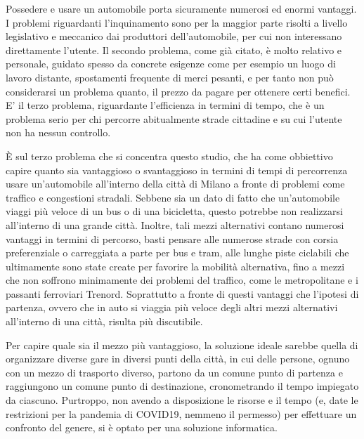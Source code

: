 Possedere e usare un automobile porta sicuramente numerosi ed enormi vantaggi. I problemi riguardanti l'inquinamento sono per la maggior parte risolti a livello legislativo e meccanico dai produttori dell'automobile, per cui non interessano direttamente l'utente. Il secondo problema, come già citato, è molto relativo e personale, guidato spesso da concrete esigenze come per esempio un luogo di lavoro distante, spostamenti frequente di merci pesanti, e per tanto non può considerarsi un problema quanto, il prezzo da pagare per ottenere certi benefici. E' il terzo problema, riguardante l'efficienza in termini di tempo, che è un problema serio per chi percorre abitualmente strade cittadine e su cui l'utente non ha nessun controllo.



È sul terzo problema che si concentra questo studio, che ha come obbiettivo capire quanto sia vantaggioso o svantaggioso in termini di tempi di percorrenza usare un'automobile all'interno della città di Milano a fronte di problemi come traffico e congestioni stradali.
Sebbene sia un dato di fatto che un'automobile viaggi più veloce di un bus o di una bicicletta, questo potrebbe non realizzarsi all'interno di una grande città. Inoltre, tali mezzi alternativi contano numerosi vantaggi in termini di percorso, basti pensare alle numerose strade con corsia preferenziale o carreggiata a parte per bus e tram, alle lunghe piste ciclabili che ultimamente sono state create per favorire la mobilità alternativa, fino a mezzi che non soffrono minimamente dei problemi del traffico, come le metropolitane e i passanti ferroviari Trenord. Soprattutto a fronte di questi vantaggi che l'ipotesi di partenza, ovvero che in auto si viaggia più veloce degli altri mezzi alternativi all'interno di una città, risulta più discutibile.

Per capire quale sia il mezzo più vantaggioso, la soluzione ideale sarebbe quella di organizzare diverse gare in diversi punti della città, in cui delle persone, ognuno con un mezzo di trasporto diverso, partono da un comune punto di partenza e raggiungono un comune punto di destinazione, cronometrando il tempo impiegato da ciascuno. Purtroppo, non avendo a disposizione le risorse e il tempo (e, date le restrizioni per la pandemia di COVID19, nemmeno il permesso) per effettuare un confronto del genere, si è optato per una soluzione informatica.

